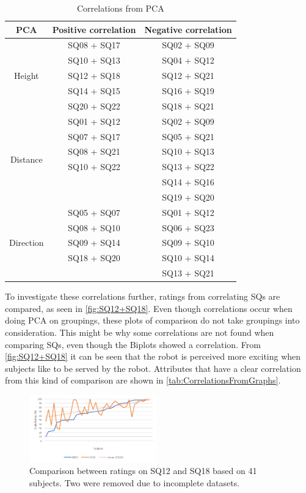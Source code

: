 \begin{table}[H]
	\centering
	\caption{Correlations from PCA}
	\label{tab:CorrelationsFromPCA} 
	\begin{tabular}{ c|c|c }
		\centering
		PCA & Positive correlation & Negative correlation \\ \hline
		\multirow{5}{*}{Height} & SQ08  + SQ17 & SQ02  + SQ09 \\
		& SQ10 + SQ13 & SQ04 + SQ12 \\
		& SQ12 + SQ18 & SQ12 + SQ21 \\
		& SQ14 + SQ15 & SQ16 + SQ19 \\
		& SQ20 + SQ22 & SQ18 + SQ21\\ \hline
		\multirow{6}{*}{Distance} & SQ01 + SQ12 & SQ02 + SQ09 \\
		& SQ07 + SQ17 & SQ05 + SQ21 \\
		& SQ08 + SQ21 & SQ10 + SQ13 \\
		& SQ10 + SQ22 & SQ13 + SQ22 \\
		&  & SQ14 + SQ16 \\	
		&  & SQ19 + SQ20 \\ \hline	
		\multirow{5}{*}{Direction} 
		& SQ05 + SQ07 & SQ01 + SQ12 \\
		& SQ08 + SQ10 & SQ06 + SQ23 \\
		& SQ09 + SQ14 & SQ09 + SQ10 \\
		& SQ18 + SQ20 & SQ10 + SQ14 \\
		&  & SQ13 + SQ21
	\end{tabular}        
\end{table}
\noindent
%
To investigate these correlations further, ratings from correlating SQs are compared, as seen in \autoref{fig:SQ12+SQ18}. Even though correlations occur when doing PCA on groupings, these plots of comparison do not take groupings into consideration. This might be why some correlations are not found when comparing SQs, even though the Biplots showed a correlation. From \autoref{fig:SQ12+SQ18} it can be seen that the robot is perceived more exciting when subjects like to be served by the robot. Attributes that have a clear correlation from this kind of comparison are shown in \autoref{tab:CorrelationsFromGraphs}.
%
\begin{figure}[H]
	\centering
	\includegraphics[width = 0.49\textwidth]{Figure/SQ12+SQ18}
	\setlength{} 
	\caption{Comparison between ratings on SQ12 and SQ18 based on 41 subjects. Two were removed due to incomplete datasets.}
	\label{fig:SQ12+SQ18}
\end{figure}
